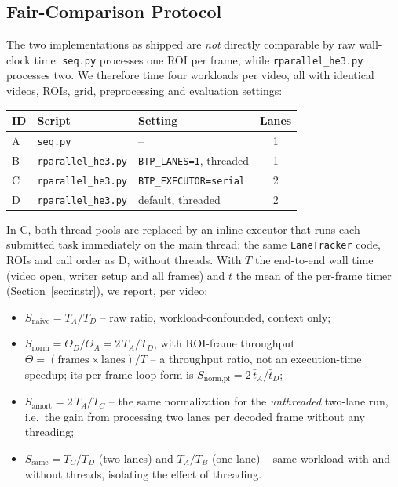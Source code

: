 \documentclass[conference]{IEEEtran}
\newcommand{\code}[1]{\texttt{#1}}
\begin{document}
\subsection{Fair-Comparison Protocol}
\label{sec:fair}
The two implementations as shipped are \emph{not} directly comparable
by raw wall-clock time: \code{seq.py} processes one ROI per frame,
while \code{rparallel\_he3.py} processes two. We therefore time four
workloads per video, all with identical videos, ROIs, grid,
preprocessing and evaluation settings:
\begin{center}
\footnotesize
\setlength{\tabcolsep}{4pt}
\begin{tabular}{lllc}
\toprule
\textbf{ID} & \textbf{Script} & \textbf{Setting} & \textbf{Lanes} \\
\midrule
A & \code{seq.py} & -- & 1 \\
B & \code{rparallel\_he3.py} & \code{BTP\_LANES=1}, threaded & 1 \\
C & \code{rparallel\_he3.py} & \code{BTP\_EXECUTOR=serial} & 2 \\
D & \code{rparallel\_he3.py} & default, threaded & 2 \\
\bottomrule
\end{tabular}
\end{center}
In C, both thread pools are replaced by an inline executor that runs each
submitted task immediately on the main thread: the same
\code{LaneTracker} code, ROIs and call order as D, without threads. With
$T$ the end-to-end wall time (video open, writer setup and all frames)
and $\bar t$ the mean of the per-frame timer (Section~\ref{sec:instr}),
we report, per video:
\begin{itemize}
\item $S_{\text{naive}} = T_A/T_D$ -- raw ratio, workload-confounded,
context only;
\item $S_{\text{norm}} = \Theta_D/\Theta_A = 2\,T_A/T_D$, with ROI-frame
throughput $\Theta = (\text{frames}\times\text{lanes})/T$ -- a throughput
ratio, not an execution-time speedup; its per-frame-loop form is
$S_{\text{norm,pf}} = 2\,\bar t_A/\bar t_D$;
\item $S_{\text{amort}} = 2\,T_A/T_C$ -- the same normalization for the
\emph{unthreaded} two-lane run, i.e.\ the gain from processing two lanes
per decoded frame without any threading;
\item $S_{\text{same}} = T_C/T_D$ (two lanes) and $T_A/T_B$ (one lane)
-- same workload with and without threads, isolating the effect of
threading.
\end{itemize}
\end{document}
